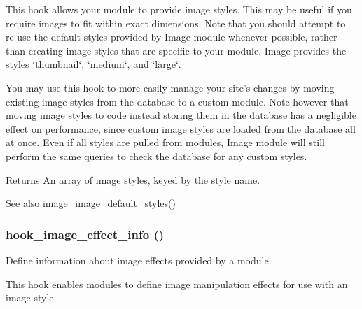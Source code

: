 This hook allows your module to provide image styles. This may be useful if you require images to fit within exact dimensions. Note that you should attempt to re-\/use the default styles provided by Image module whenever possible, rather than creating image styles that are specific to your module. Image provides the styles \char`\"{}thumbnail\char`\"{}, \char`\"{}medium\char`\"{}, and \char`\"{}large\char`\"{}.

You may use this hook to more easily manage your site's changes by moving existing image styles from the database to a custom module. Note however that moving image styles to code instead storing them in the database has a negligible effect on performance, since custom image styles are loaded from the database all at once. Even if all styles are pulled from modules, Image module will still perform the same queries to check the database for any custom styles.

\begin{DoxyReturn}{Returns}
An array of image styles, keyed by the style name. 
\end{DoxyReturn}
\begin{DoxySeeAlso}{See also}
\hyperlink{image_8module_ac412aad2549572b4f2dae20d2dbd89ae}{image\_\-image\_\-default\_\-styles()} 
\end{DoxySeeAlso}
\hypertarget{group__hooks_ga9681816aeb01a316e98457b40a01f8ed}{
\subsubsection[{hook\_\-image\_\-effect\_\-info}]{\setlength{\rightskip}{0pt plus 5cm}hook\_\-image\_\-effect\_\-info ()}}
\label{group__hooks_ga9681816aeb01a316e98457b40a01f8ed}
Define information about image effects provided by a module.

This hook enables modules to define image manipulation effects for use with an image style.

